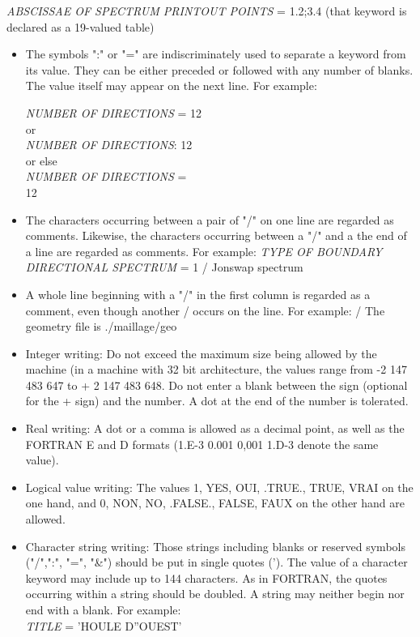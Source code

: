 \textit{ABSCISSAE OF SPECTRUM PRINTOUT POINTS }= 1.2;3.4   (that keyword is declared as a 19-valued table)

\begin{itemize}
\item  The symbols ":" or "=" are indiscriminately used to separate a keyword from its value. They can be either preceded or followed with any number of blanks. The value itself may appear on the next line. For example:    

\textit{NUMBER OF DIRECTIONS} = 12\\
    or \\   \textit{NUMBER OF DIRECTIONS}: 12 \\  or else \\  \textit{NUMBER OF DIRECTIONS} =\\   12

\item  The characters occurring between a pair of "/" on one line are regarded as comments. Likewise, the characters occurring between a "/" and a the end of a line are regarded as comments. For example:  \textit{TYPE OF BOUNDARY DIRECTIONAL SPECTRUM }= 1 / Jonswap spectrum

\item  A whole line beginning with a "/" in the first column is regarded as a comment, even though another / occurs on the line. For example:  / The geometry file is ./maillage/geo

\item  Integer writing: Do not exceed the maximum size being allowed by the machine (in a machine with 32 bit architecture, the values range from -2 147 483 647 to + 2 147 483 648. Do not enter a blank between the sign (optional for the + sign) and the number. A dot at the end of the number is tolerated.

\item  Real writing: A dot or a comma is allowed as a decimal point, as well as the FORTRAN E and D formats (1.E-3 0.001 0,001 1.D-3 denote the same value).

\item  Logical value writing: The values 1, YES, OUI, .TRUE., TRUE, VRAI on the one hand, and 0, NON, NO, .FALSE., FALSE, FAUX on the other hand are allowed.

\item  Character string writing: Those strings including blanks or reserved symbols ("/",":", "=", "\&") should be put in single quotes ('). The value of a character keyword may include up to 144 characters. As in FORTRAN, the quotes occurring within a string should be doubled. A string may neither begin nor end with a blank. For example:   \\
\textit{TITLE} = 'HOULE D''OUEST'
\end{itemize}

